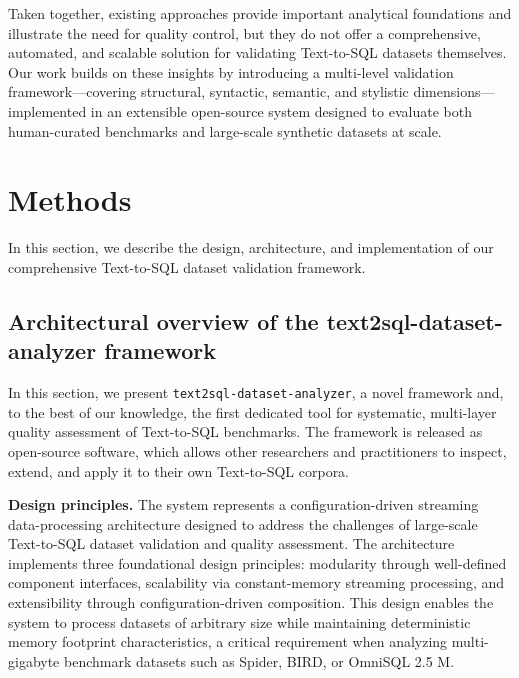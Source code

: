 \documentclass[print]{einformatica}
\begin{document}
Taken together, existing approaches provide important analytical foundations and illustrate the need for quality control, but they do not offer a comprehensive, automated, and scalable solution for validating Text-to-SQL datasets themselves. Our work builds on these insights by introducing a multi-level validation framework---covering structural, syntactic, semantic, and stylistic dimensions---implemented in an extensible open-source system designed to evaluate both human-curated benchmarks and large-scale synthetic datasets at scale.

\section{Methods}\label{sec:Methods}

In this section, we describe the design, architecture, and implementation of our comprehensive Text-to-SQL dataset validation framework.

\subsection{Architectural overview of the text2sql-dataset-analyzer framework}

In this section, we present \texttt{text2sql-dataset-analyzer}, a novel framework and, to the best of our knowledge, the first dedicated tool for systematic, multi-layer quality assessment of Text-to-SQL benchmarks. The framework is released as open-source software, which allows other researchers and practitioners to inspect, extend, and apply it to their own Text-to-SQL corpora. 

\textbf{Design principles.} The system represents a configuration-driven streaming data-processing architecture designed to address the challenges of large-scale Text-to-SQL dataset validation and quality assessment. The architecture implements three foundational design principles: modularity through well-defined component interfaces, scalability via constant-memory streaming processing, and extensibility through configuration-driven composition. This design enables the system to process datasets of arbitrary size while maintaining deterministic memory footprint characteristics, a critical requirement when analyzing multi-gigabyte benchmark datasets such as Spider, BIRD, or OmniSQL 2.5 M.
\end{document}

